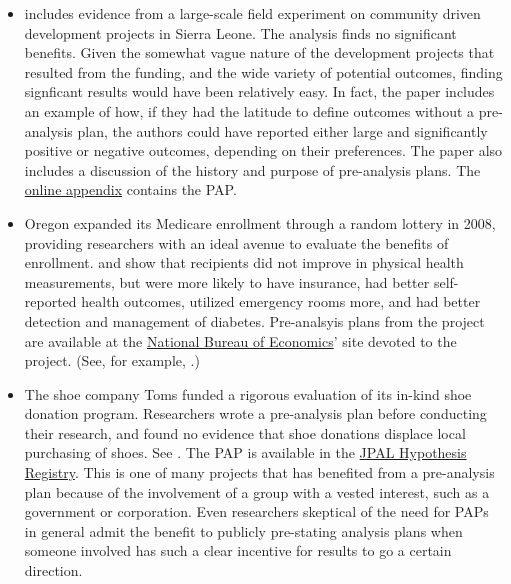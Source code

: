 \documentclass[12pt] {article}
\begin{document}
\begin{itemize}
\item 
 \cite{casey_reshaping_2012} includes evidence from a large-scale field experiment on community driven development projects in Sierra Leone. The analysis finds no significant benefits. Given the somewhat vague nature of the development projects that resulted from the funding, and the wide variety of potential outcomes, finding signficant results would have been relatively easy. In fact, the paper includes an example of how, if they had the latitude to define outcomes without a pre-analysis plan, the authors could have reported either large and significantly positive or negative outcomes, depending on their preferences. The paper also includes a discussion of the history and purpose of pre-analysis plans. The \href{http://emiguel.econ.berkeley.edu/assets/miguel_research/8/_Appendix__Reshaping_Institutions_-_Evidence__on__Aid__Impacts__Using__a__Pre___Analysis__Plan.pdf}{online appendix}
contains the PAP.

\item 
Oregon expanded its Medicare enrollment through a random lottery in 2008, providing researchers with an ideal avenue to evaluate the benefits of enrollment. \cite{finkelstein_oregon_2012, doi:10.1056/NEJMsa1212321} and \cite{Taubman17012014} show that recipients did not improve in physical health measurements, but were more likely to have insurance, had better self-reported health outcomes, utilized emergency rooms more, and had better detection and management of diabetes. Pre-analsyis plans from the project are available at the \href{http://www.nber.org/oregon/documents.html}{National Bureau of Economics}' site devoted to the project. (See, for example, \cite{taubman_oregon_2013, baicker_katherine_oregon_2014}.)


\item
The shoe company Toms funded a rigorous evaluation of its in-kind shoe donation program. Researchers wrote a pre-analysis plan before conducting their research, and found no evidence that shoe donations displace local purchasing of shoes. See \cite{wydick_-kind_2014, katz_elizabeth_pre-analysis_2013}. The PAP is available in the \href{http://www.povertyactionlab.org/doc/pre-analysis-planwydick2-12-13pdf}{JPAL Hypothesis Registry}. This is one of many projects that has benefited from a pre-analysis plan because of the involvement of a group with a vested interest, such as a government or corporation. Even researchers skeptical of the need for PAPs in general admit the benefit to publicly pre-stating analysis plans when someone involved has such a clear incentive for results to go a certain direction. 


\end{itemize}
\end{document}
